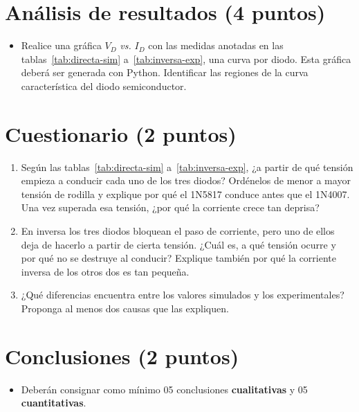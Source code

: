\documentclass[11pt,a4paper]{article}
\newcommand{\puntos}[1]{\normalfont\normalsize\textmd{(#1 puntos)}}
\begin{document}
\FloatBarrier
\section{Análisis de resultados \puntos{4}}
\label{sec:analisis}
\begin{itemize}
    \item Realice una gráfica $V_D$ \emph{vs.} $I_D$ con las medidas anotadas en las
          tablas~\ref{tab:directa-sim} a~\ref{tab:inversa-exp}, una curva por diodo. Esta gráfica
          deberá ser generada con Python. Identificar las regiones de la curva característica del
          diodo semiconductor.
\end{itemize}

\section{Cuestionario \puntos{2}}
\begin{enumerate}[label=\arabic*., leftmargin=2em]
    \item Según las tablas~\ref{tab:directa-sim} a~\ref{tab:inversa-exp}, ¿a partir de
          qué tensión empieza a conducir cada uno de los tres diodos? Ordénelos de menor
          a mayor tensión de rodilla y explique por qué el 1N5817 conduce antes que el
          1N4007. Una vez superada esa tensión, ¿por qué la corriente crece tan deprisa?
    \item En inversa los tres diodos bloquean el paso de corriente, pero uno de ellos
          deja de hacerlo a partir de cierta tensión. ¿Cuál es, a qué tensión ocurre y
          por qué no se destruye al conducir? Explique también por qué la corriente
          inversa de los otros dos es tan pequeña.
    \item ¿Qué diferencias encuentra entre los valores simulados y los experimentales?
          Proponga al menos dos causas que las expliquen.
\end{enumerate}

\section{Conclusiones \puntos{2}}
\begin{itemize}
    \item Deberán consignar como mínimo 05 conclusiones \textbf{cualitativas} y 05
          \textbf{cuantitativas}.
\end{itemize}
\end{document}
